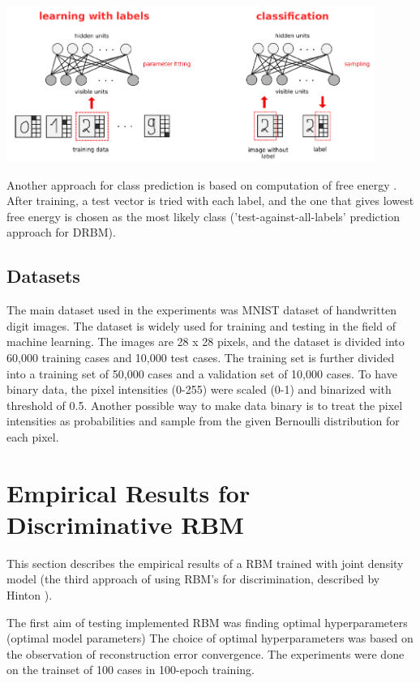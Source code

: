 \documentclass[a4paper]{scrartcl}
\begin{document}
\begin{center}
\includegraphics[width=12cm]{images/DRBM.png}
\end{center}
Another approach for class prediction is based on computation of free energy \cite{Hinton}. After training, a test vector is tried with each label, and the one that gives lowest free energy is chosen as the most likely class ('test-against-all-labels' prediction approach for DRBM).

\subsection{Datasets}
\par The main dataset used in the experiments was MNIST dataset of handwritten digit images. The dataset is widely used for training and testing in the field of machine learning. The images are 28 x 28 pixels, and the dataset is divided into 60,000 training cases and 10,000 test cases. The training set is further divided into a training set of 50,000 cases and a validation set of 10,000 cases. To have binary data, the pixel intensities (0-255) were scaled (0-1) and binarized with threshold of 0.5. Another possible way to make data binary is to treat the pixel intensities as probabilities and sample from the given Bernoulli distribution for each pixel. 
 
\section{Empirical Results for Discriminative RBM}
This section describes the empirical results of a RBM trained with joint density model (the third approach of using RBM's for discrimination, described by Hinton \cite{Hinton}).
\par The first aim of testing implemented RBM was finding optimal hyperparameters (optimal model parameters) The choice of optimal hyperparameters was based on the observation of reconstruction error convergence. The experiments were done on the trainset of 100 cases in 100-epoch training. 
\end{document}
